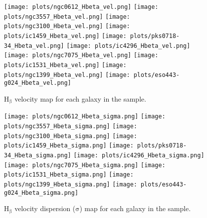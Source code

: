 \documentclass[fleqn,usenatbib,useAMS]{mnras}
\begin{document}
        \begin{figure*}
            \centering
            \texttt{[image: plots/ngc0612\_Hbeta\_vel.png]}
            \texttt{[image: plots/ngc3557\_Hbeta\_vel.png]}
            \texttt{[image: plots/ngc3100\_Hbeta\_vel.png]}
            \texttt{[image: plots/ic1459\_Hbeta\_vel.png]}
            \texttt{[image: plots/pks0718-34\_Hbeta\_vel.png]}
            \texttt{[image: plots/ic4296\_Hbeta\_vel.png]}
            \texttt{[image: plots/ngc7075\_Hbeta\_vel.png]}
            \texttt{[image: plots/ic1531\_Hbeta\_vel.png]}
            \texttt{[image: plots/ngc1399\_Hbeta\_vel.png]}
            \texttt{[image: plots/eso443-g024\_Hbeta\_vel.png]}
            \caption{H$_\mathrm{\beta}$ velocity map for each galaxy in the sample.}
            \label{fig:Hbeta_vel}
        \end{figure*}


        \begin{figure*}
            \centering
            \texttt{[image: plots/ngc0612\_Hbeta\_sigma.png]}
            \texttt{[image: plots/ngc3557\_Hbeta\_sigma.png]}
            \texttt{[image: plots/ngc3100\_Hbeta\_sigma.png]}
            \texttt{[image: plots/ic1459\_Hbeta\_sigma.png]}
            \texttt{[image: plots/pks0718-34\_Hbeta\_sigma.png]}
            \texttt{[image: plots/ic4296\_Hbeta\_sigma.png]}
            \texttt{[image: plots/ngc7075\_Hbeta\_sigma.png]}
            \texttt{[image: plots/ic1531\_Hbeta\_sigma.png]}
            \texttt{[image: plots/ngc1399\_Hbeta\_sigma.png]}
            \texttt{[image: plots/eso443-g024\_Hbeta\_sigma.png]}
            \caption{H$_\mathrm{\beta}$ velocity dispersion ($\mathrm{\sigma}$) map for each galaxy in the sample.}
            \label{fig:Hbeta_sigma}
        \end{figure*}
\end{document}
